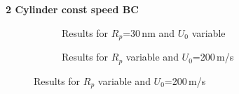 \textbf{2 Cylinder const speed BC}
\begin{figure}[H]
            \begin{subfigure}{0.49\textwidth}
                  \flushleft
                  \caption{Results for $R_{p}$=30\,nm and $U_{0}$ variable}\label{subfig:tw_constBC_U0_var}
          \end{subfigure}\hfill
        \begin{subfigure}{0.49\textwidth}
                \flushright
                \caption{Results for $R_{p}$ variable and $U_{0}$=200\,\textmu m/s}\label{subfig:tw_constBC_Rp_var}

\end{subfigure}
\end{figure}

